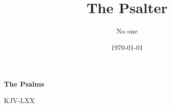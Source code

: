 \documentclass[12pt,openany]{book}
\title{The Psalter}
\author{No one}
\date{\today}
\begin{document}
\begin{titlepage}
  \begin{center}
  \vspace*{2in}

  \begin{Huge}
  \textbf{The Psalms}
  \end{Huge}

  \vspace{0.25in}
  \begin{small}
  KJV-LXX
  \end{small}

  \vfill

  \end{center}
\end{titlepage}

\newpage




\thispagestyle{empty}
\ %

\newpage



\newpage

\thispagestyle{empty}
\ %

\newpage

\newpage
\pagestyle{plain}
\end{document}

